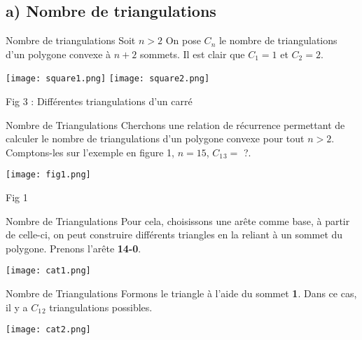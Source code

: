 \documentclass{beamer}
\begin{document}
\subsection{a) Nombre de triangulations}
    \begin{frame}{Nombre de triangulations}
        Soit $n > 2$ \newline\newline
        On pose $C_n$ le nombre de triangulations d'un polygone convexe à $n+2$ sommets. \newline
        Il est clair que $C_1 = 1$ et $C_2 = 2$.

    \begin{center}
        \texttt{[image: square1.png]}
        \texttt{[image: square2.png]}
        
        Fig 3 : Différentes triangulations d'un carré
    \end{center}
    \end{frame}
    \begin{frame}{Nombre de Triangulations}
        Cherchons une relation de récurrence permettant de calculer le nombre de triangulations d'un polygone convexe pour tout $n > 2$.\newline\newline
        Comptons-les sur l'exemple en figure 1, $n = 15$, $C_1{}_3 = $ ?.
        \begin{center}
            \texttt{[image: fig1.png]}
            
            Fig 1
        \end{center}
    \end{frame}
    \begin{frame}{Nombre de Triangulations}
        Pour cela, choisissons une arête comme base, à partir de celle-ci, on peut construire différents triangles en la reliant à un sommet du polygone. Prenons l'arête \textbf{14-0}.
        \begin{center}
            \texttt{[image: cat1.png]}
        \end{center}
    \end{frame}
    \begin{frame}{Nombre de Triangulations}
        Formons le triangle à l'aide du sommet \textbf{1}. \newline
        Dans ce cas, il y a $C_1{}_2$ triangulations possibles.
        \begin{center}
            \texttt{[image: cat2.png]}
        \end{center}
    \end{frame}
\end{document}
